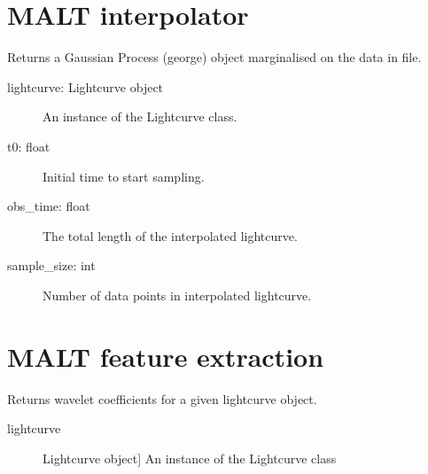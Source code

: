 \documentclass[a4paper,10pt,english]{sphinxmanual}
\begin{document}
\section{MALT interpolator}
\label{\detokenize{api:module-malt.interpolator}}\label{\detokenize{api:malt-interpolator}}

\begin{fulllineitems}
\label{\detokenize{api:malt.interpolator.get_gp}}
Returns a Gaussian Process (george) object marginalised on the data
in file.
\begin{description}
\item[{lightcurve: Lightcurve object}] \leavevmode
An instance of the Lightcurve class.

\item[{t0: float}] \leavevmode
Initial time to start sampling.

\item[{obs\_time: float}] \leavevmode
The total length of the interpolated lightcurve.

\item[{sample\_size: int}] \leavevmode
Number of data points in interpolated lightcurve.

\end{description}

\end{fulllineitems}



\section{MALT feature extraction}
\label{\detokenize{api:module-malt.feature_extraction}}\label{\detokenize{api:malt-feature-extraction}}

\begin{fulllineitems}
\label{\detokenize{api:malt.feature_extraction.get_wavelet_feature}}
Returns wavelet coefficients for a given lightcurve object.
\begin{description}
\item[{lightcurve}] \leavevmode{[}Lightcurve object{]}
An instance of the Lightcurve class

\end{description}

\end{fulllineitems}
\end{document}
